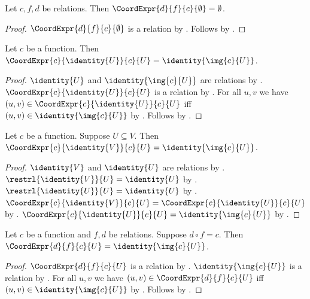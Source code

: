\begin{theorem}\label{coordinate_expression_empty}
    Let $c,f,d$ be relations.
    Then $\CoordExpr{d}{f}{c}{\emptyset}=\emptyset$.
\end{theorem}
\begin{proof}
    $\CoordExpr{d}{f}{c}{\emptyset}$ is a relation by
        .
    Follows by .
\end{proof}

\begin{theorem}\label{coordinate_expression_identity}
    Let $c$ be a function.
    Then $\CoordExpr{c}{\identity{U}}{c}{U}=\identity{\img{c}{U}}$.
\end{theorem}
\begin{proof}
    $\identity{U}$ and $\identity{\img{c}{U}}$ are relations by .
    $\CoordExpr{c}{\identity{U}}{c}{U}$ is a relation by
        .
    For all $u,v$ we have $(u,v)\in\CoordExpr{c}{\identity{U}}{c}{U}$ iff
        $(u,v)\in\identity{\img{c}{U}}$ by
        .
    Follows by .
\end{proof}

\begin{theorem}\label{coordinate_expression_partial_identity}
    Let $c$ be a function.
    Suppose $U\subseteq V$.
    Then $\CoordExpr{c}{\identity{V}}{c}{U}=\identity{\img{c}{U}}$.
\end{theorem}
\begin{proof}
    $\identity{V}$ and $\identity{U}$ are relations by .
    $\restrl{\identity{V}}{U}=\identity{U}$ by
        .
    $\restrl{\identity{U}}{U}=\identity{U}$ by .
    $\CoordExpr{c}{\identity{V}}{c}{U}=\CoordExpr{c}{\identity{U}}{c}{U}$ by
        .
    $\CoordExpr{c}{\identity{U}}{c}{U}=\identity{\img{c}{U}}$ by
        .
\end{proof}

\begin{theorem}\label{coordinate_expression_factorization}
    Let $c$ be a function and $f,d$ be relations.
    Suppose $d\circ f=c$.
    Then $\CoordExpr{d}{f}{c}{U}=\identity{\img{c}{U}}$.
\end{theorem}
\begin{proof}
    $\CoordExpr{d}{f}{c}{U}$ is a relation by .
    $\identity{\img{c}{U}}$ is a relation by .
    For all $u,v$ we have $(u,v)\in\CoordExpr{d}{f}{c}{U}$ iff
        $(u,v)\in\identity{\img{c}{U}}$ by
        .
    Follows by .
\end{proof}

